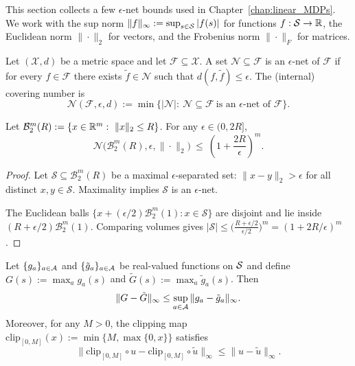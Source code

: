 This section collects a few $\epsilon$-net bounds used in
Chapter~\ref{chap:linear_MDPs}.  We work with the sup norm
$\|f\|_\infty := \sup_{s\in\mathcal{S}} |f(s)|$ for functions $f:\mathcal{S}\to\mathbb{R}$, the Euclidean norm
$\|\cdot\|_2$ for vectors, and the Frobenius norm $\|\cdot\|_F$ for matrices.

\begin{definition}
Let $(\mathcal{X},d)$ be a metric space and let $\mathcal{F}\subseteq\mathcal{X}$.
A set $\mathcal{N}\subseteq \mathcal{F}$ is an $\epsilon$-net of $\mathcal{F}$ if for every
$f\in\mathcal{F}$ there exists $\tilde f\in\mathcal{N}$ such that $d(f,\tilde f)\le \epsilon$.
The (internal) covering number is
\[
\mathcal{N}(\mathcal{F},\epsilon,d)
:=
\min\Big\{|\mathcal{N}|:\ \mathcal{N}\subseteq \mathcal{F}\ \text{is an $\epsilon$-net of $\mathcal{F}$}\Big\}.
\]
\end{definition}

\begin{lemma}\label{lem:volumetric_cover_ball}
Let $\mathcal{B}_2^m(R):=\{x\in\mathbb{R}^m:\ \|x\|_2\le R\}$.
For any $\epsilon\in(0,2R]$,
\[
\mathcal{N}\big(\mathcal{B}_2^m(R),\epsilon,\|\cdot\|_2\big)
\ \le\
\left(1+\frac{2R}{\epsilon}\right)^m.
\]
\end{lemma}

\begin{proof}
Let $\mathcal{S}\subseteq \mathcal{B}_2^m(R)$ be a maximal $\epsilon$-separated set:
$\|x-y\|_2>\epsilon$ for all distinct $x,y\in\mathcal{S}$.
Maximality implies $\mathcal{S}$ is an $\epsilon$-net.

The Euclidean balls $\{x + (\epsilon/2)\mathcal{B}_2^m(1): x\in\mathcal{S}\}$ are disjoint and lie
inside $(R+\epsilon/2)\mathcal{B}_2^m(1)$. Comparing volumes gives
$|\mathcal{S}| \le \big(\frac{R+\epsilon/2}{\epsilon/2}\big)^m = (1+2R/\epsilon)^m$.
\end{proof}

\begin{lemma}\label{lem:max_clip_contraction_app}
Let $\{g_a\}_{a\in\mathcal{A}}$ and $\{\tilde g_a\}_{a\in\mathcal{A}}$ be real-valued functions on $\mathcal{S}$ and
define $G(s):=\max_{a} g_a(s)$ and $\tilde G(s):=\max_{a}\tilde g_a(s)$.
Then
\[
\|G-\tilde G\|_\infty \le \sup_{a\in\mathcal{A}}\|g_a-\tilde g_a\|_\infty.
\]
Moreover, for any $M>0$, the clipping map $\mathrm{clip}_{[0,M]}(x):=\min\{M,\max\{0,x\}\}$ satisfies
\[
\|\mathrm{clip}_{[0,M]}\circ u - \mathrm{clip}_{[0,M]}\circ \tilde u\|_\infty \le \|u-\tilde u\|_\infty.
\]
\end{lemma}


